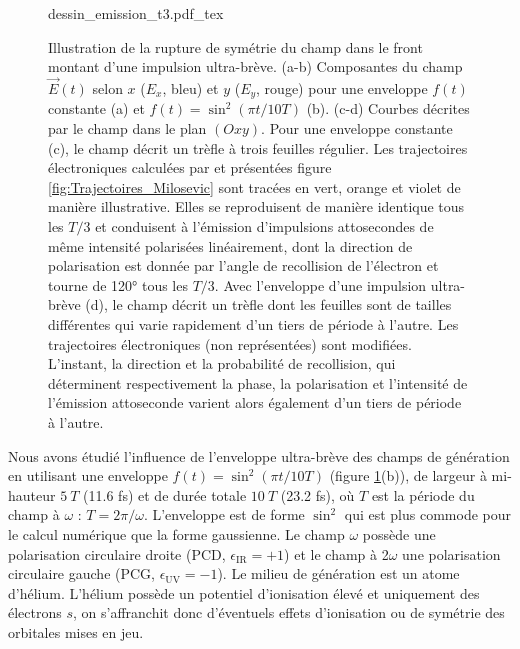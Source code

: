 \begin{figure}
\centering
\def\svgwidth{\textwidth}
{dessin_emission_t3.pdf_tex}
\caption{Illustration de la rupture de symétrie du champ dans le front montant d'une impulsion ultra-brève. (a-b) Composantes du champ $\vec{E}(t)$ selon $x$ ($E_x$, bleu) et $y$ ($E_y$, rouge) pour une enveloppe  $f(t)$ constante (a) et $f(t) = \sin^2 (\pi t / 10 T)$ (b). (c-d) Courbes décrites par le champ dans le plan $(Oxy)$. Pour une enveloppe constante (c), le champ décrit un trèfle à trois feuilles régulier. Les trajectoires électroniques calculées par  et présentées figure \ref{fig:Trajectoires_Milosevic} sont tracées en vert, orange et violet de manière illustrative. Elles se reproduisent de manière identique tous les $T/3$ et conduisent à l'émission d'impulsions attosecondes de même intensité polarisées linéairement, dont la direction de polarisation est donnée par l'angle de recollision de l'électron et tourne de 120° tous les $T/3$. Avec l'enveloppe d'une impulsion ultra-brève (d), le champ décrit un trèfle dont les feuilles sont de tailles différentes qui varie rapidement d'un tiers de période à l'autre. Les trajectoires électroniques (non représentées) sont modifiées. L'instant, la direction et la probabilité de recollision, qui déterminent respectivement la phase, la polarisation et l'intensité de l'émission attoseconde varient alors également d'un tiers de période à l'autre.}
\label{fig:dessin_emission_t3}
\end{figure}

Nous avons étudié l'influence de l'enveloppe ultra-brève des champs de génération en utilisant une enveloppe $f(t) = \sin^2 (\pi t / 10 T)$ (figure \ref{fig:dessin_emission_t3}(b)), de largeur à mi-hauteur $5 \: T$ (11.6 fs) et de durée totale $10 \: T$ (23.2 fs), où $T$ est la période du champ à $\omega$ : $T = 2\pi/\omega$. L'enveloppe est de forme $\sin^2$ qui est plus commode pour le calcul numérique que la forme gaussienne. Le champ $\omega$ possède une polarisation circulaire droite (PCD, $\epsilon_{\text{IR}} = +1$) et le champ à 2$\omega$ une polarisation circulaire gauche (PCG,  $\epsilon_{\text{UV}} = -1$). Le milieu de génération est un atome d'hélium. L'hélium possède un potentiel d'ionisation élevé et uniquement des électrons $s$, on s'affranchit donc d'éventuels effets d'ionisation ou de symétrie des orbitales mises en jeu.

